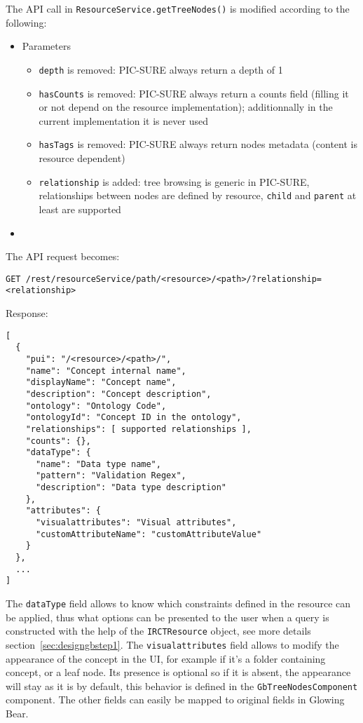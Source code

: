 The API call in \verb|ResourceService.getTreeNodes()| is modified according to the following:
\begin{itemize}
    \item Parameters
    \begin{itemize}
        \item \verb|depth| is removed: PIC-SURE always return a depth of 1
        \item \verb|hasCounts| is removed: PIC-SURE always return a counts field (filling it or not depend on the resource implementation); additionnally in the current implementation it is never used
        \item \verb|hasTags| is removed: PIC-SURE always return nodes metadata (content is resource dependent)
        \item \verb|relationship| is added: tree browsing is generic in PIC-SURE, relationships between nodes are defined by resource, \verb|child| and \verb|parent| at least are supported
    \end{itemize}
    \item 
\end{itemize}

The API request becomes:
\begin{verbatim}
GET /rest/resourceService/path/<resource>/<path>/?relationship=<relationship>
\end{verbatim}

Response:
\begin{verbatim}
[
  {
    "pui": "/<resource>/<path>/",
    "name": "Concept internal name",
    "displayName": "Concept name",
    "description": "Concept description",
    "ontology": "Ontology Code",
    "ontologyId": "Concept ID in the ontology",
    "relationships": [ supported relationships ],
    "counts": {},
    "dataType": {
      "name": "Data type name",
      "pattern": "Validation Regex",
      "description": "Data type description"
    },
    "attributes": {
      "visualattributes": "Visual attributes",
      "customAttributeName": "customAttributeValue"
    }
  },
  ...
]
\end{verbatim}

The \verb|dataType| field allows to know which constraints defined in the resource can be applied, thus what options can be presented to the user when a query is constructed with the help of the \verb|IRCTResource| object, see more details section~\ref{sec:designgbstep1}.
The \verb|visualattributes| field allows to modify the appearance of the concept in the UI, for example if it's a folder containing concept, or a leaf node. 
Its presence is optional so if it is absent, the appearance will stay as it is by default, this behavior is defined in the \verb|GbTreeNodesComponent| component.
The other fields can easily be mapped to original fields in Glowing Bear.

